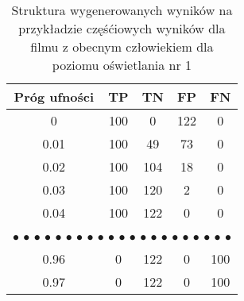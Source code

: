 \begin{table}[H]
    \centering
    \caption{Struktura wygenerowanych wyników na przykładzie częśćiowych wyników dla filmu z obecnym człowiekiem dla poziomu oświetlania nr 1}
    \begin{tabular}{ccccc}
    \hline
    \multicolumn{1}{|c|}{Próg   ufności} & \multicolumn{1}{c|}{TP}                    & \multicolumn{1}{c|}{TN}                    & \multicolumn{1}{c|}{FP}                    & \multicolumn{1}{c|}{FN}                    \\ \hline
    \multicolumn{1}{|c|}{0}                                 & \multicolumn{1}{c|}{100}                   & \multicolumn{1}{c|}{0}                     & \multicolumn{1}{c|}{122}                   & \multicolumn{1}{c|}{0}                     \\ \hline
    \multicolumn{1}{|c|}{0.01}                              & \multicolumn{1}{c|}{100}                   & \multicolumn{1}{c|}{49}                    & \multicolumn{1}{c|}{73}                    & \multicolumn{1}{c|}{0}                     \\ \hline
    \multicolumn{1}{|c|}{0.02}                              & \multicolumn{1}{c|}{100}                   & \multicolumn{1}{c|}{104}                   & \multicolumn{1}{c|}{18}                    & \multicolumn{1}{c|}{0}                     \\ \hline
    \multicolumn{1}{|c|}{0.03}                              & \multicolumn{1}{c|}{100}                   & \multicolumn{1}{c|}{120}                   & \multicolumn{1}{c|}{2}                     & \multicolumn{1}{c|}{0}                     \\ \hline
    \multicolumn{1}{|c|}{0.04}                              & \multicolumn{1}{c|}{100}                   & \multicolumn{1}{c|}{122}                   & \multicolumn{1}{c|}{0}                     & \multicolumn{1}{c|}{0}                     \\ \hline
    \multicolumn{5}{c}{$\bullet$ $\bullet$   $\bullet$ $\bullet$ $\bullet$ $\bullet$ $\bullet$ $\bullet$ $\bullet$   $\bullet$ $\bullet$ $\bullet$ $\bullet$ $\bullet$ $\bullet$ $\bullet$   $\bullet$ $\bullet$ $\bullet$ $\bullet$ $\bullet$} \\ \hline
    \multicolumn{1}{|c|}{0.96}                              & \multicolumn{1}{c|}{0}                     & \multicolumn{1}{c|}{122}                   & \multicolumn{1}{c|}{0}                     & \multicolumn{1}{c|}{100}                   \\ \hline
    \multicolumn{1}{|c|}{0.97}                              & \multicolumn{1}{c|}{0}                     & \multicolumn{1}{c|}{122}                   & \multicolumn{1}{c|}{0}                     & \multicolumn{1}{c|}{100}                   \\ \hline

\end{tabular}
\end{table}
